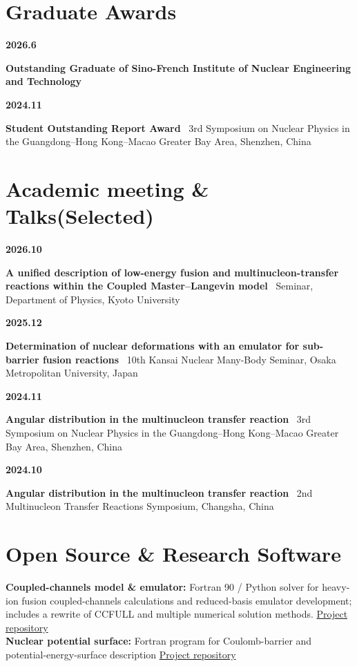 \documentclass[10pt]{article}
\newlength{\datecol}
\newcommand{\cvrow}[2]{%
  \noindent\begin{minipage}[t]{\datecol}\color{accent}\bfseries\small #1\end{minipage}%
  \begin{minipage}[t]{\dimexpr\linewidth-\datecol\relax}#2\end{minipage}\par\vspace{7pt}%
}
\begin{document}
\section*{Graduate Awards}

\cvrow{2026.6}{\textbf{Outstanding Graduate of Sino-French Institute of Nuclear Engineering and Technology} }

\cvrow{2024.11}{\textbf{Student Outstanding Report Award} \textperiodcentered\ 3rd Symposium on Nuclear Physics in the Guangdong--Hong Kong--Macao Greater Bay Area, Shenzhen, China}




\section*{Academic meeting  \&  Talks(Selected)}

\cvrow{2026.10}{\textbf{A unified description of low-energy fusion and multinucleon-transfer
  reactions within the Coupled Master--Langevin model} \textperiodcentered\ Seminar, Department of
  Physics, Kyoto University}
\cvrow{2025.12}{\textbf{Determination of nuclear deformations with an emulator for sub-barrier
  fusion reactions} \textperiodcentered\ 10th Kansai Nuclear Many-Body Seminar, Osaka Metropolitan
  University, Japan}
\cvrow{2024.11}{\textbf{Angular distribution in the multinucleon transfer reaction}
  \textperiodcentered\ 3rd Symposium on Nuclear Physics in the Guangdong--Hong Kong--Macao Greater
  Bay Area, Shenzhen, China}
\cvrow{2024.10}{\textbf{Angular distribution in the multinucleon transfer reaction}
  \textperiodcentered\ 2nd Multinucleon Transfer Reactions Symposium, Changsha, China}

\section*{Open Source \& Research Software}
\textbf{Coupled-channels model \& emulator:} Fortran 90 / Python solver for heavy-ion fusion
coupled-channels calculations and reduced-basis emulator development; includes a rewrite of
CCFULL and multiple numerical solution methods.
\href{https://github.com/murry-liao/CCFULL_ReduceBasisMethod_Emulator}{Project repository}\\[3pt]
\textbf{Nuclear potential surface:} Fortran program for Coulomb-barrier and
potential-energy-surface description
\href{https://murry-liao.github.io/file_code/}{Project repository}
\end{document}
